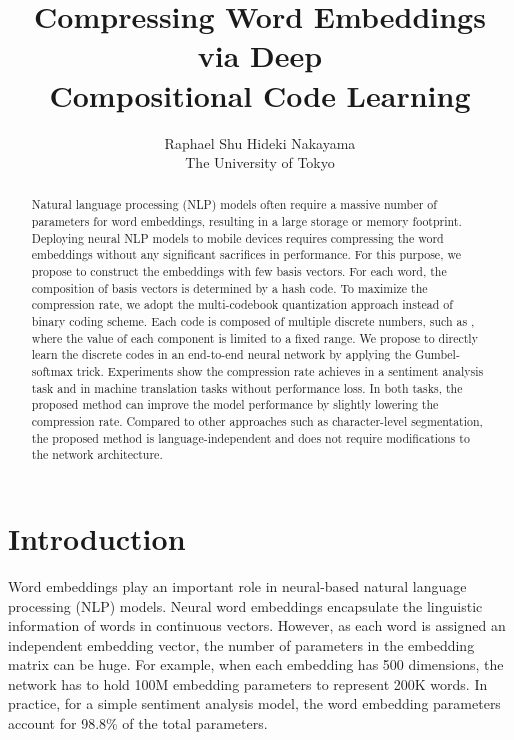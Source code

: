 \documentclass{article} \usepackage{iclr2018_conference_review,times}
\begin{document}
\title{Compressing Word Embeddings via Deep \\ Compositional Code Learning}

\author{Raphael Shu \: Hideki Nakayama \\
The University of Tokyo
}

\maketitle

\begin{abstract}
Natural language processing (NLP) models often require a massive number of parameters for word embeddings, resulting in a large storage or memory footprint. Deploying neural NLP models to mobile devices requires compressing the word embeddings without any significant sacrifices in performance. For this purpose, we propose to construct the embeddings with few basis vectors. For each word, the composition of basis vectors is determined by a hash code. To maximize the compression rate, we adopt the multi-codebook quantization approach instead of binary coding scheme. Each code is composed of multiple discrete numbers, such as , where the value of each component is limited to a fixed range. We propose to directly learn the discrete codes in an end-to-end neural network by applying the Gumbel-softmax trick. Experiments show the compression rate achieves  in a sentiment analysis task and  in machine translation tasks without performance loss. In both tasks, the proposed method can improve the model performance by slightly lowering the compression rate. Compared to other approaches such as character-level segmentation, the proposed method is language-independent and does not require modifications to the network architecture.
\end{abstract}


\section{Introduction}
Word embeddings play an important role in neural-based natural language processing (NLP) models. Neural word embeddings encapsulate the linguistic information of words in continuous vectors. However, as each word is assigned an independent embedding vector, the number of parameters in the embedding matrix can be huge. For example, when each embedding has 500 dimensions, the network has to hold 100M embedding parameters to represent 200K words. In practice, for a simple sentiment analysis model, the word embedding parameters account for 98.8\% of the total parameters.
\end{document}
